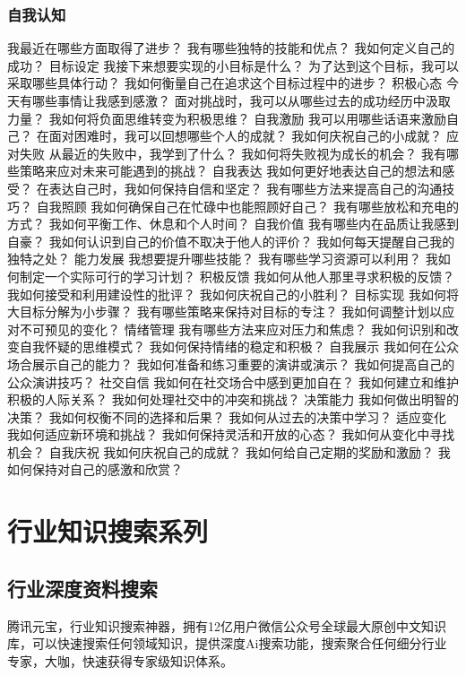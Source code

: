 \documentclass[12pt]{book}
\begin{document}
\subsection{自我认知}
我最近在哪些方面取得了进步？
我有哪些独特的技能和优点？
我如何定义自己的成功？
目标设定
我接下来想要实现的小目标是什么？
为了达到这个目标，我可以采取哪些具体行动？
我如何衡量自己在追求这个目标过程中的进步？
积极心态
今天有哪些事情让我感到感激？
面对挑战时，我可以从哪些过去的成功经历中汲取力量？
我如何将负面思维转变为积极思维？
自我激励
我可以用哪些话语来激励自己？
在面对困难时，我可以回想哪些个人的成就？
我如何庆祝自己的小成就？
应对失败
从最近的失败中，我学到了什么？
我如何将失败视为成长的机会？
我有哪些策略来应对未来可能遇到的挑战？
自我表达
我如何更好地表达自己的想法和感受？
在表达自己时，我如何保持自信和坚定？
我有哪些方法来提高自己的沟通技巧？
自我照顾
我如何确保自己在忙碌中也能照顾好自己？
我有哪些放松和充电的方式？
我如何平衡工作、休息和个人时间？
自我价值
我有哪些内在品质让我感到自豪？
我如何认识到自己的价值不取决于他人的评价？
我如何每天提醒自己我的独特之处？
能力发展
我想要提升哪些技能？
我有哪些学习资源可以利用？
我如何制定一个实际可行的学习计划？
积极反馈
我如何从他人那里寻求积极的反馈？
我如何接受和利用建设性的批评？
我如何庆祝自己的小胜利？
目标实现
我如何将大目标分解为小步骤？
我有哪些策略来保持对目标的专注？
我如何调整计划以应对不可预见的变化？
情绪管理
我有哪些方法来应对压力和焦虑？
我如何识别和改变自我怀疑的思维模式？
我如何保持情绪的稳定和积极？
自我展示
我如何在公众场合展示自己的能力？
我如何准备和练习重要的演讲或演示？
我如何提高自己的公众演讲技巧？
社交自信
我如何在社交场合中感到更加自在？
我如何建立和维护积极的人际关系？
我如何处理社交中的冲突和挑战？
决策能力
我如何做出明智的决策？
我如何权衡不同的选择和后果？
我如何从过去的决策中学习？
适应变化
我如何适应新环境和挑战？
我如何保持灵活和开放的心态？
我如何从变化中寻找机会？
自我庆祝
我如何庆祝自己的成就？
我如何给自己定期的奖励和激励？
我如何保持对自己的感激和欣赏？


\chapter{行业知识搜索系列}

\section{行业深度资料搜索}
腾讯元宝，行业知识搜索神器，拥有12亿用户微信公众号全球最大原创中文知识库，可以快速搜索任何领域知识，提供深度Ai搜索功能，搜索聚合任何细分行业专家，大咖，快速获得专家级知识体系。
\end{document}
